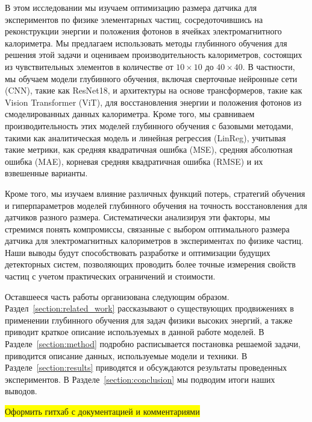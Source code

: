 \documentclass[a4paper,12pt]{extarticle}
\begin{document}

В этом исследовании мы изучаем оптимизацию размера датчика для экспериментов по физике элементарных частиц, сосредоточившись на реконструкции энергии и положения фотонов в ячейках электромагнитного калориметра. Мы предлагаем использовать методы глубинного обучения для решения этой задачи и оцениваем производительность калориметров, состоящих из чувствительных элементов в количестве от $10 \times 10$ до $40 \times 40$. В частности, мы обучаем модели глубинного обучения, включая сверточные нейронные сети (CNN), такие как ResNet18, и архитектуры на основе трансформеров, такие как Vision Transformer (ViT), для восстановления энергии и положения фотонов из смоделированных данных калориметра. Кроме того, мы сравниваем производительность этих моделей глубинного обучения с базовыми методами, такими как аналитическая модель и линейная регрессия (LinReg), учитывая такие метрики, как средняя квадратичная ошибка (MSE), средняя абсолютная ошибка (MAE), корневая средняя квадратичная ошибка (RMSE) и их взвешенные варианты.

Кроме того, мы изучаем влияние различных функций потерь, стратегий обучения и гиперпараметров моделей глубинного обучения на точность восстановления для датчиков разного размера. Систематически анализируя эти факторы, мы стремимся понять компромиссы, связанные с выбором оптимального размера датчика для электромагнитных калориметров в экспериментах по физике частиц. Наши выводы будут способствовать разработке и оптимизации будущих детекторных систем, позволяющих проводить более точные измерения свойств частиц с учетом практических ограничений и стоимости.

Оставшееся часть работы организована следующим образом. Раздел~\ref{section:related_work} рассказывают о существующих продвижениях в применении глубинного обучения для задач физики высоких энергий, а также приводит краткое описание используемых в данной работе моделей. В Разделе~\ref{section:method} подробно расписывается постановка решаемой задачи, приводится описание данных, используемые модели и техники. В Разделе~\ref{section:results} приводятся и обсуждаются результаты проведенных экспериментов. В Разделе~\ref{section:conclusion} мы подводим итоги наших выводов.

\colorbox{yellow}{Оформить гитхаб с документацией и комментариями}
\end{document}
